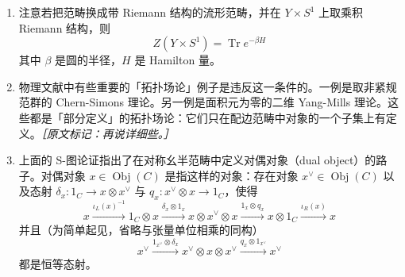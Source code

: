 \begin{enumerate}
  \item 注意若把范畴换成带 Riemann 结构的流形范畴，并在 $Y\times S^1$ 上取乘积 Riemann 结构，则
\begin{equation}
  Z(Y\times S^1)=\operatorname{Tr}e^{-\beta H}
  \tag{5.19}
  \label{eq:5.19}
\end{equation}
其中 $\beta$ 是圆的半径，$H$ 是 Hamilton 量。
  \item 物理文献中有些重要的「拓扑场论」例子是违反这一条件的。一例是取非紧规范群的 Chern-Simons 理论。另一例是面积元为零的二维 Yang-Mills 理论。这些都是「部分定义」的拓扑场论：它们只在配边范畴中对象的一个子集上有定义。{\small\itshape ［原文标记：再说详细些。］}
  \item 上面的 S-图论证指出了在对称幺半范畴中定义对偶对象（dual object）的路子。对偶对象 $x\in\operatorname{Obj}(C)$ 是指这样的对象：存在对象 $x^\vee\in\operatorname{Obj}(C)$ 以及态射 $\delta_x:1_C\to x\otimes x^\vee$ 与 $q_x:x^\vee\otimes x\to1_C$，使得
\begin{equation}
  x\xrightarrow{\iota_L(x)^{-1}}1_C\otimes x\xrightarrow{\delta_x\otimes1_x}x\otimes x^\vee\otimes x\xrightarrow{1_x\otimes q_x}x\otimes1_C\xrightarrow{\iota_R(x)}x
  \tag{5.20}
  \label{eq:5.20}
\end{equation}
并且（为简单起见，省略与张量单位相乘的同构）
\begin{equation}
  x^\vee\xrightarrow{1_{x^\vee}\otimes\delta_x}x^\vee\otimes x\otimes x^\vee\xrightarrow{q_x\otimes1_{x^\vee}}x^\vee
  \tag{5.21}
  \label{eq:5.21}
\end{equation}
都是恒等态射。
\end{enumerate}

